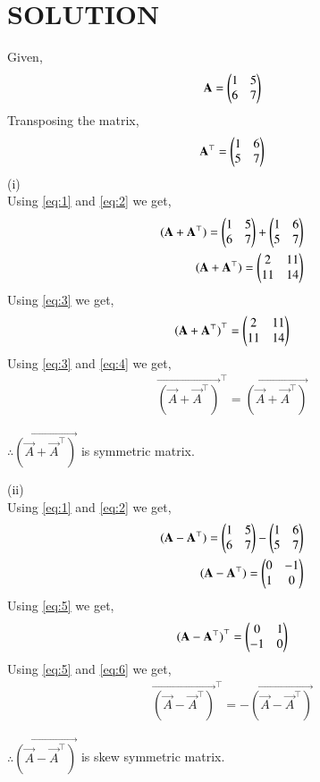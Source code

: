 \documentclass[journal,12pt,twocolumn]{IEEEtran}
\begin{document}
\section*{SOLUTION}
\begin{enumerate}
Given,
\begin{align}
\label{eq:1}
    \Vec{A}=\myvec{1 & 5\\6 & 7}
\end{align}
Transposing the matrix,
\begin{align}
    \label{eq:2}
    \Vec{A}^\top=\myvec{1 & 6 \\5 & 7}
\end{align}
(i)\\
Using \eqref{eq:1} and \eqref{eq:2} we get,
\begin{align}
\mathbf{(\mathbf{A}+\mathbf{A}^\top)}=\begin{pmatrix}1 & 5\\6 & 7\end{pmatrix}+\begin{pmatrix}1 & 6 \\5 & 7\end{pmatrix}\\
\label{eq:3}
\mathbf{(\mathbf{A}+\mathbf{A}^\top)}=\begin{pmatrix}2 & 11\\11 & 14\end{pmatrix}
\end{align}
Using \eqref{eq:3} we get,
\begin{align}
\label{eq:4}
\mathbf{(\mathbf{A}+\mathbf{A}^\top)}^\top=\begin{pmatrix}2 & 11\\11 & 14\end{pmatrix}
\end{align}
Using \eqref{eq:3} and \eqref{eq:4} we get,
\begin{align}
  \vec{(\vec{A}+\vec{A}^\top)}^\top=\vec{(\vec{A}+\vec{A}^\top)}
\end{align}
\begin{center}
    $\therefore \vec{(\vec{A}+\vec{A}^\top)}$ is symmetric matrix. 
\end{center}

(ii)\\
Using \eqref{eq:1} and \eqref{eq:2} we get,
\begin{align}
\mathbf{(\mathbf{A}-\mathbf{A}^\top)}=\begin{pmatrix}1 & 5\\6 & 7\end{pmatrix}-\begin{pmatrix}1 & 6 \\5 & 7\end{pmatrix}\\
\label{eq:5}
\mathbf{(\mathbf{A}-\mathbf{A}^\top)}=\begin{pmatrix}0 & -1\\1 & 0\end{pmatrix}
\end{align}
Using \eqref{eq:5} we get,
\begin{align}
\label{eq:6}
\mathbf{(\mathbf{A}-\mathbf{A}^\top)}^\top=\begin{pmatrix}0 & 1\\-1 & 0\end{pmatrix}
\end{align}
Using \eqref{eq:5} and \eqref{eq:6} we get,
\begin{align}
 \vec{(\vec{A}-\vec{A}^\top)}^\top=- \vec{(\vec{A}-\vec{A}^\top)}
\end{align}
\begin{center}
    $\therefore \vec{(\vec{A}-\vec{A}^\top)}$ is skew symmetric matrix. 
\end{center}

\end{enumerate}
\end{document}
